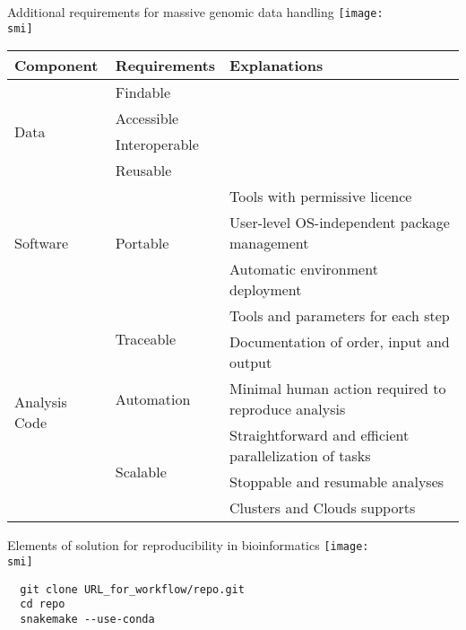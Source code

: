 \documentclass[10pt]{beamer}
\def\smi{out/ln/updir/mw-gcthesis-oral/library.bib}
\begin{document}
\begin{frame}{Additional requirements for massive genomic data handling}
  \def\smi{out/ln/updir/mw-gcthesis-oral/ink/reproducibility/arrow_reproducibility.pdf}
  \texttt{[image: \\smi]}

  {\scriptsize
  \begin{tabular}{@{}lll@{}}
    \toprule
    Component                      & Requirements                & Explanations            \\ \midrule
    \multirow{4}{*}{Data}          & Findable &                                \\
    & Accessible                        &       \\
    & Interoperable                    &        \\ 
    & Reusable                          &       \\ \midrule
    \multirow{3}{*}{Software}             & \multirow{3}{*}{Portable} & Tools with permissive licence \\
    & & User-level OS-independent package management            \\
    & & Automatic environment deployment           \\ \midrule
    \multirow{6}{*}{Analysis Code} & \multirow{2}{*}{Traceable} & Tools and parameters for each step       \\
    & & Documentation of order, input and output \\
    & Automation & Minimal human action required to reproduce analysis \\ 
    & \multirow{3}{*}{Scalable} & Straightforward and efficient parallelization of tasks \\
    & & Stoppable and resumable analyses \\
    & & Clusters and Clouds supports \\ \bottomrule
  \end{tabular}
  }
\end{frame}
\begin{frame}[fragile]{Elements of solution for reproducibility in bioinformatics}
  \def\smi{out/ln/updir/mw-gcthesis-oral/ink/reproducibility/arrow_reproducibility_solutions.pdf}
  \texttt{[image: \\smi]}
  \begin{lstlisting}
  git clone URL_for_workflow/repo.git
  cd repo
  snakemake --use-conda
  \end{lstlisting}
\end{frame}
\end{document}
